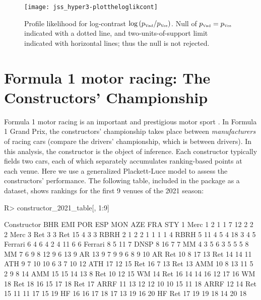 \documentclass[article]{jss}
\begin{document}
\begin{figure}[t!]
\centering
\texttt{[image: jss\_hyper3-plottheloglikcont]}
\caption{Profile \label{profliklogcont} likelihood for log-contrast
$\log\left(p_{\mbox{\tiny Vad}}/ p_{\mbox{\tiny Ves}}\right)$.  Null
of $p_{\mbox{\tiny Vad}}=p_{\mbox{\tiny Ves}}$ indicated with a dotted
line, and two-units-of-support limit indicated with horizontal lines;
thus the null is not rejected.}
\end{figure}

\section{Formula 1 motor racing: The Constructors' Championship}\label{f1}

Formula 1 motor racing is an important and prestigious motor sport
\citep{codling2017,jenkins2010}.  In Formula 1 Grand Prix, the
constructors' championship takes place between {\em manufacturers} of
racing cars (compare the drivers' championship, which is between
drivers).  In this analysis, the constructor is the object of
inference.  Each constructor typically fields two cars, each of which
separately accumulates ranking-based points at each venue.  Here we
use a generalized Plackett-Luce model to assess the constructors'
performance.  The following table, included in the 
package as a dataset, shows rankings for the first 9 venues of the
2021 season:
%
\begin{Schunk}
\begin{Sinput}
R> constructor_2021_table[, 1:9]
\end{Sinput}
\begin{Soutput}
   Constructor BHR EMI POR ESP  MON AZE FRA STY
1         Merc   1   2   1   1    7  12   2   2
2         Merc   3 Ret   3   3  Ret  15   4   3
3         RBRH   2   1   2   2    1   1   1   1
4         RBRH   5  11   4   5    4  18   3   4
5      Ferrari   6   4   6   4    2   4  11   6
6      Ferrari   8   5  11   7 DNSP   8  16   7
7           MM   4   3   5   6    3   5   5   5
8           MM   7   6   9   8   12   9   6  13
9           AR  13   9   7   9    9   6   8   9
10          AR Ret  10   8  17   13 Ret  14  14
11         ATH   9   7  10  10    6   3   7  10
12         ATH  17  12  15 Ret   16   7  13 Ret
13         AMM  10   8  13  11    5   2   9   8
14         AMM  15  15  14  13    8 Ret  10  12
15          WM  14 Ret  16  14   14  16  12  17
16          WM  18 Ret  18  16   15  17  18 Ret
17        ARRF  11  13  12  12   10  10  15  11
18        ARRF  12  14 Ret  15   11  11  17  15
19          HF  16  16  17  18   17  13  19  16
20          HF Ret  17  19  19   18  14  20  18
\end{Soutput}
\end{Schunk}
\end{document}
